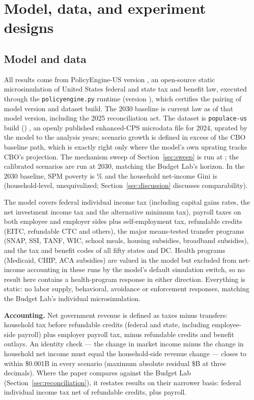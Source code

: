 \section{Model, data, and experiment designs}\label{sec:method}

\subsection{Model and data}

All results come from PolicyEngine-US version \genModelVersion{}
\citep{policyengineus}, an open-source static microsimulation of United
States federal and state tax and benefit law, executed through the
\texttt{policyengine.py} runtime (version \genRunnerVersion{}), which
certifies the pairing of model version and dataset build. The 2030 baseline
is current law as of that model version, including the 2025 reconciliation
act. The dataset is \texttt{populace-us} build \texttt{\genDataBuildShort}
(\genDataBuildDate{}) \citep{populaceus}, an openly published enhanced-CPS
microdata file for 2024, uprated by the model to the analysis years; scenario
growth is defined in excess of the CBO baseline path, which is exactly right
only where the model's own uprating tracks CBO's projection. The mechanism
sweep of Section~\ref{sec:sweep} is run at \genSweepYear{}; the calibrated
scenarios are run at 2030, matching the Budget Lab's horizon. In the 2030
baseline, SPM poverty is \genBaselinePovertyPct\% and the household
net-income Gini is \genBaselineGini{} (household-level, unequivalized;
Section~\ref{sec:discussion} discusses comparability).

The model covers federal individual income tax (including capital gains
rates, the net investment income tax and the alternative minimum tax),
payroll taxes on both employee and employer sides plus self-employment tax,
refundable credits (EITC, refundable CTC and others), the major means-tested
transfer programs (SNAP, SSI, TANF, WIC, school meals, housing subsidies,
broadband subsidies), and the tax and benefit codes of all fifty states and
DC. Health programs (Medicaid, CHIP, ACA subsidies) are valued in the model
but excluded from net-income accounting in these runs by the model's default
simulation switch, so no result here contains a health-program response in
either direction. Everything is static: no labor supply, behavioral,
avoidance or enforcement responses, matching the Budget Lab's individual
microsimulation.

\textbf{Accounting.} Net government revenue is defined as taxes minus
transfers: household tax before refundable credits (federal and state,
including employee-side payroll) plus employer payroll tax, minus refundable
credits and benefit outlays. An identity check --- the change in market
income minus the change in household net income must equal the household-side
revenue change --- closes to within \$0.001B in every scenario (maximum
absolute residual \$\genIdentityMaxResidual B at three decimals).
Where the paper compares against the Budget Lab
(Section~\ref{sec:reconciliation}), it restates results on their narrower
basis: federal individual income tax net of refundable credits, plus payroll.

